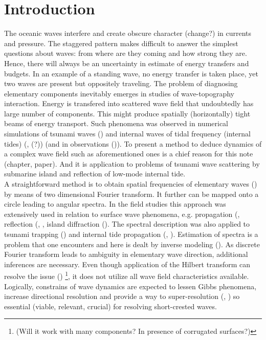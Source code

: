 \section{Introduction}
The oceanic waves interfere and create obscure character (change?) in currents and pressure. The staggered pattern makes difficult to answer the simplest questions about waves: from where are they coming and how strong they are. Hence, there will always be an uncertainty in estimate of energy transfers and budgets. In an example of a standing wave, no energy transfer is taken place, yet two waves are present but oppositely traveling. The problem of diagnosing elementary components inevitably emerges in studies of wave-topography interaction. Energy is transfered into scattered wave field that undoubtedly has large number of components. This might produce spatially (horizontally) tight beams of energy transport. Such phenomena was observed in numerical simulations of tsunami waves (\cite{tang2012direct}) and internal waves of tidal frequency (internal tides) (\cite{simmons2004internal}, \cite{arbic2010concurrent}(?)) (and in observations (\cite{zhao2016global})). To present a method to deduce dynamics of a complex wave field such as aforementioned ones is a chief reason for this note (chapter, paper). And it is application to problems of tsunami wave scattering by submarine island and reflection of low-mode internal tide.\\

A straightforward method is to obtain spatial frequencies of elementary waves (\cite{barber1963directional}) by means of two dimensional Fourier transform. It further can be mapped onto a circle leading to angular spectra. In the field studies this approach was extensively used in relation to surface wave phenomena, e.g. propagation (\cite{munk1963directional}, reflection (\cite{dickson1995wave}, \cite{thomson2005reflection}, island diffraction (\cite{pawka1983island}). The spectral description was also applied to tsunami trapping (\cite{romano2013wavenumber}) and internal tide propagation (\cite{hendry1977observations}, \cite{lozovatsky2003spatial}). Estimation of spectra is a problem that one encounters and here is dealt by inverse modeling (\cite{long1986inverse}). As discrete Fourier transform leads to ambiguity in elementary wave direction, additional inferences are necessary. Even though application of the Hilbert transform can resolve the issue (\cite{mercier2008reflection}) \footnote{(Will it work with many components? In presence of corrugated surfaces?)}, it does not utilize all wave field characteristics available. Logically, constrains of wave dynamics are expected to lessen Gibbs phenomena, increase directional resolution and provide a way to super-resolution (\cite{kay1981spectrum}, \cite{sacchi1998interpolation}) so essential (viable, relevant, crucial) for resolving short-crested waves.\\

